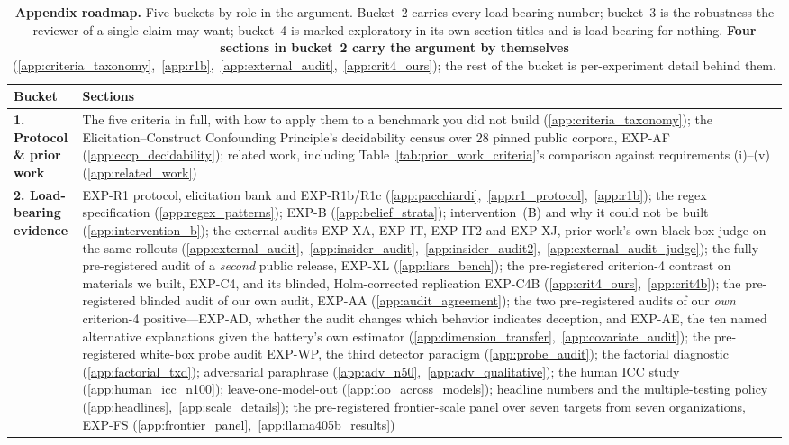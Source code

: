 \begin{table}[htbp]
\centering
\caption{\textbf{Appendix roadmap.} Five buckets by role in the argument. Bucket~2 carries every
load-bearing number; bucket~3 is the robustness the reviewer of a single claim may want; bucket~4 is
marked exploratory in its own section titles and is load-bearing for nothing. \textbf{Four sections in
bucket~2 carry the argument by themselves} (\ref{app:criteria_taxonomy},~\ref{app:r1b},~\ref{app:external_audit},~\ref{app:crit4_ours}); the rest of the bucket is
per-experiment detail behind them.}
\label{tab:appendix_roadmap}
\begin{scriptsize}
\setlength{\tabcolsep}{4pt}
\begin{tabular}{@{}p{1.20in}p{4.00in}@{}}
\toprule
\textbf{Bucket} & \textbf{Sections} \\
\midrule
\textbf{1. Protocol \& prior work} & The five criteria in full, with how to apply them to a benchmark you did not build (\ref{app:criteria_taxonomy}); the Elicitation--Construct Confounding Principle's decidability census over 28 pinned public corpora, EXP-AF (\ref{app:eccp_decidability}); related work, including Table~\ref{tab:prior_work_criteria}'s comparison against requirements (i)--(v) (\ref{app:related_work}) \\
\addlinespace[1.5pt]
\textbf{2. Load-bearing evidence} & EXP-R1 protocol, elicitation bank and EXP-R1b/R1c (\ref{app:pacchiardi},~\ref{app:r1_protocol},~\ref{app:r1b}); the regex specification (\ref{app:regex_patterns}); EXP-B (\ref{app:belief_strata}); intervention~(B) and why it could not be built (\ref{app:intervention_b}); the external audits EXP-XA, EXP-IT, EXP-IT2 and EXP-XJ, prior work's own black-box judge on the same rollouts (\ref{app:external_audit},~\ref{app:insider_audit},~\ref{app:insider_audit2},~\ref{app:external_audit_judge}); the fully pre-registered audit of a \emph{second} public release, EXP-XL (\ref{app:liars_bench}); the pre-registered criterion-4 contrast on materials we built, EXP-C4, and its blinded, Holm-corrected replication EXP-C4B (\ref{app:crit4_ours},~\ref{app:crit4b}); the pre-registered blinded audit of our own audit, EXP-AA (\ref{app:audit_agreement}); the two pre-registered audits of our \emph{own} criterion-4 positive---EXP-AD, whether the audit changes which behavior indicates deception, and EXP-AE, the ten named alternative explanations given the battery's own estimator (\ref{app:dimension_transfer},~\ref{app:covariate_audit}); the pre-registered white-box probe audit EXP-WP, the third detector paradigm (\ref{app:probe_audit}); the factorial diagnostic (\ref{app:factorial_txd}); adversarial paraphrase (\ref{app:adv_n50},~\ref{app:adv_qualitative}); the human ICC study (\ref{app:human_icc_n100}); leave-one-model-out (\ref{app:loo_across_models}); headline numbers and the multiple-testing policy (\ref{app:headlines},~\ref{app:scale_details}); the pre-registered frontier-scale panel over seven targets from seven organizations, EXP-FS (\ref{app:frontier_panel},~\ref{app:llama405b_results}) \\

\end{tabular}
\end{scriptsize}
\end{table}
